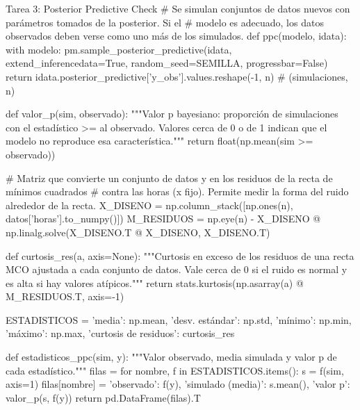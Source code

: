 \documentclass[11pt,letterpaper]{article}
\begin{document}
\begin{codigo}[label=cod:t3]{Tarea 3: Posterior Predictive Check}
# Se simulan conjuntos de datos nuevos con parámetros tomados de la posterior. Si el
# modelo es adecuado, los datos observados deben verse como uno más de los simulados.
def ppc(modelo, idata):
    with modelo:
        pm.sample_posterior_predictive(idata, extend_inferencedata=True, random_seed=SEMILLA,
                                       progressbar=False)
    return idata.posterior_predictive['y_obs'].values.reshape(-1, n)  # (simulaciones, n)


def valor_p(sim, observado):
    """Valor p bayesiano: proporción de simulaciones con el estadístico >= al observado.
    Valores cerca de 0 o de 1 indican que el modelo no reproduce esa característica."""
    return float(np.mean(sim >= observado))


# Matriz que convierte un conjunto de datos y en los residuos de la recta de mínimos cuadrados
# contra las horas (x fijo). Permite medir la forma del ruido alrededor de la recta.
X_DISENO = np.column_stack([np.ones(n), datos['horas'].to_numpy()])
M_RESIDUOS = np.eye(n) - X_DISENO @ np.linalg.solve(X_DISENO.T @ X_DISENO, X_DISENO.T)


def curtosis_res(a, axis=None):
    """Curtosis en exceso de los residuos de una recta MCO ajustada a cada conjunto de datos.
    Vale cerca de 0 si el ruido es normal y es alta si hay valores atípicos."""
    return stats.kurtosis(np.asarray(a) @ M_RESIDUOS.T, axis=-1)


ESTADISTICOS = {'media': np.mean, 'desv. estándar': np.std, 'mínimo': np.min, 'máximo': np.max,
                'curtosis de residuos': curtosis_res}


def estadisticos_ppc(sim, y):
    """Valor observado, media simulada y valor p de cada estadístico."""
    filas = {}
    for nombre, f in ESTADISTICOS.items():
        s = f(sim, axis=1)
        filas[nombre] = {'observado': f(y), 'simulado (media)': s.mean(), 'valor p': valor_p(s, f(y))}
    return pd.DataFrame(filas).T



\end{codigo}
\end{document}
